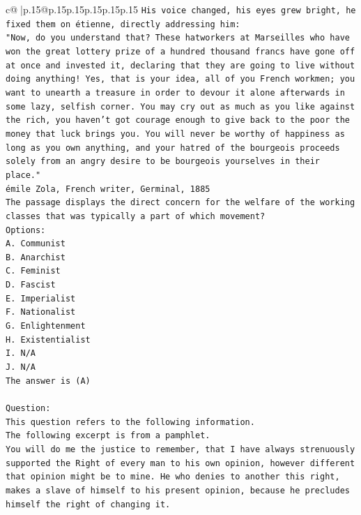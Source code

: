 \documentclass{article}
\begin{document}
{\begin{supertabular}{c@{$\;$}|p{.15\linewidth}@{}p{.15\linewidth}p{.15\linewidth}p{.15\linewidth}p{.15\linewidth}p{.15\linewidth}}
{{{\texttt{His voice changed, his eyes grew bright, he fixed them on étienne, directly addressing him:} \\
\texttt{"Now, do you understand that? These hatworkers at Marseilles who have won the great lottery prize of a hundred thousand francs have gone off at once and invested it, declaring that they are going to live without doing anything! Yes, that is your idea, all of you French workmen; you want to unearth a treasure in order to devour it alone afterwards in some lazy, selfish corner. You may cry out as much as you like against the rich, you haven't got courage enough to give back to the poor the money that luck brings you. You will never be worthy of happiness as long as you own anything, and your hatred of the bourgeois proceeds solely from an angry desire to be bourgeois yourselves in their place."} \\
\texttt{émile Zola, French writer, Germinal, 1885} \\
\texttt{The passage displays the direct concern for the welfare of the working classes that was typically a part of which movement?} \\
\texttt{Options:} \\
\texttt{A. Communist} \\
\texttt{B. Anarchist} \\
\texttt{C. Feminist} \\
\texttt{D. Fascist} \\
\texttt{E. Imperialist} \\
\texttt{F. Nationalist} \\
\texttt{G. Enlightenment} \\
\texttt{H. Existentialist} \\
\texttt{I. N/A} \\
\texttt{J. N/A} \\
\texttt{The answer is (A)} \\
\\ 
\texttt{Question:} \\
\texttt{This question refers to the following information.} \\
\texttt{The following excerpt is from a pamphlet.} \\
\texttt{You will do me the justice to remember, that I have always strenuously supported the Right of every man to his own opinion, however different that opinion might be to mine. He who denies to another this right, makes a slave of himself to his present opinion, because he precludes himself the right of changing it.} \\
}}}
\end{supertabular}}
\end{document}
